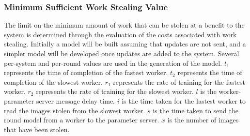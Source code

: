 \documentclass[12pt]{article}
\begin{document}
\subsubsection{Minimum Sufficient Work Stealing Value}
The limit on the minimum amount of work that can be stolen at a benefit to the system is determined through the evaluation of the costs associated with work stealing. Initially a model will be built assuming that updates are not sent, and a simpler model will be developed once updates are added to the system.
\newline
\newline
Several per-system and per-round values are used in the generation of the model.
$t_1$ represents the time of completion of the fastest worker.
$t_2$ represents the time of completion of the slowest worker.
$r_1$ represents the rate of training for the fastest worker.
$r_2$ represents the rate of training for the slowest worker.
$l$ is the worker-parameter server message delay time.
$i$ is the time taken for the fastest worker to read the images stolen from the slowest worker.
$s$ is the time taken to send the round model from a worker to the parameter server.
$x$ is the number of images that have been stolen.
\end{document}
